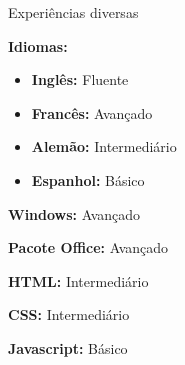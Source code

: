 \begin{rubric}{Experiências diversas}

  \entry* 
  \textbf{Idiomas:} 
  \begin{itemize}
  \item \textbf{Inglês:} Fluente
  \item \textbf{Francês:} Avançado

  \item \textbf{Alemão:} Intermediário

  \item \textbf{Espanhol:} Básico

  \end{itemize}

  \entry* \textbf{Windows:} Avançado

  \entry* \textbf{Pacote Office:} Avançado

  \entry* \textbf{HTML:} Intermediário

  \entry* \textbf{CSS:} Intermediário

  \entry* \textbf{Javascript:} Básico

\end{rubric}
